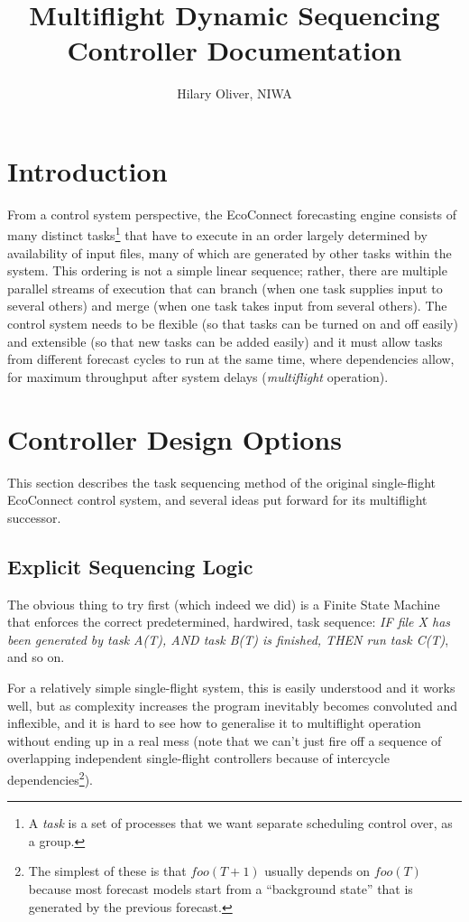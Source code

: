 \documentclass[a4paper,12pt]{amsart}
\title{Multiflight Dynamic Sequencing Controller Documentation}
\author{Hilary Oliver, NIWA}
\begin{document}
\maketitle

\section{Introduction} 

From a control system perspective, the EcoConnect forecasting engine
consists of many distinct tasks\footnote{A {\em task} is a set of
processes that we want separate scheduling control over, as a group.}
that have to execute in an order largely determined by availability of
input files, many of which are generated by other tasks within the
system. This ordering is not a simple linear sequence; rather, there are
multiple parallel streams of execution that can branch (when one task
supplies input to several others) and merge (when one task takes input
from several others). The control system needs to be flexible (so that
tasks can be turned on and off easily) and extensible (so that new tasks
can be added easily) and it must allow tasks from different forecast
cycles to run at the same time, where dependencies allow, for maximum
throughput after system delays ({\em multiflight} operation). 


\section{Controller Design Options}

This section describes the task sequencing method of the original
single-flight EcoConnect control system, and several ideas put forward
for its multiflight successor.

\subsection{Explicit Sequencing Logic}

The obvious thing to try first (which indeed we did) is a Finite State
Machine that enforces the correct predetermined, hardwired, task
sequence: {\em IF file X has been generated by task A(T), AND task B(T)
is finished, THEN run task C(T)}, and so on. 

For a relatively simple single-flight system, this is easily understood
and it works well, but as complexity increases the program inevitably
becomes convoluted and inflexible, and it is hard to see how to
generalise it to multiflight operation without ending up in a real mess
(note that we can't just fire off a sequence of overlapping independent
single-flight controllers because of intercycle
dependencies\footnote{The simplest of these is that $foo(T+1)$ usually
depends on $foo(T)$ because most forecast models start from a
``background state'' that is generated by the previous forecast.}). 
\end{document}
